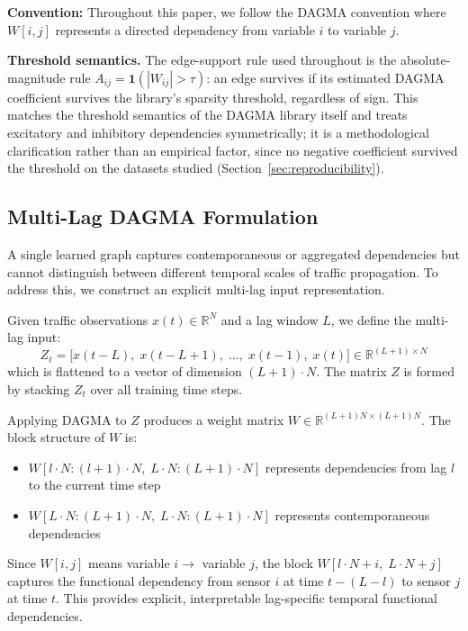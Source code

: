 \textbf{Convention:} Throughout this paper, we follow the DAGMA convention where $W[i,j]$ represents a directed dependency from variable $i$ to variable $j$.

\textbf{Threshold semantics.} The edge-support rule used throughout is the absolute-magnitude rule $A_{ij} = \mathbf{1}(|W_{ij}| > \tau)$: an edge survives if its estimated DAGMA coefficient survives the library's sparsity threshold, regardless of sign. This matches the threshold semantics of the DAGMA library itself and treats excitatory and inhibitory dependencies symmetrically; it is a methodological clarification rather than an empirical factor, since no negative coefficient survived the threshold on the datasets studied (Section~\ref{sec:reproducibility}).

\subsection{Multi-Lag DAGMA Formulation}\label{sec:multilag}

A single learned graph captures contemporaneous or aggregated dependencies but cannot distinguish between different temporal scales of traffic propagation. To address this, we construct an explicit multi-lag input representation.

Given traffic observations $x(t) \in \mathbb{R}^N$ and a lag window $L$, we define the multi-lag input:
\begin{equation}
Z_t = \big[x(t{-}L),\; x(t{-}L{+}1),\; \ldots,\; x(t{-}1),\; x(t)\big] \in \mathbb{R}^{(L+1) \times N}
\end{equation}
which is flattened to a vector of dimension $(L+1) \cdot N$. The matrix $Z$ is formed by stacking $Z_t$ over all training time steps.

Applying DAGMA to $Z$ produces a weight matrix $W \in \mathbb{R}^{(L+1)N \times (L+1)N}$. The block structure of $W$ is:
\begin{itemize}
    \item $W[l \cdot N : (l{+}1) \cdot N,\; L \cdot N : (L{+}1) \cdot N]$ represents dependencies from lag $l$ to the current time step
    \item $W[L \cdot N : (L{+}1) \cdot N,\; L \cdot N : (L{+}1) \cdot N]$ represents contemporaneous dependencies
\end{itemize}

Since $W[i,j]$ means variable $i \rightarrow$ variable $j$, the block $W[l \cdot N + i,\; L \cdot N + j]$ captures the functional dependency from sensor $i$ at time $t{-}(L{-}l)$ to sensor $j$ at time $t$. This provides explicit, interpretable lag-specific temporal functional dependencies.

